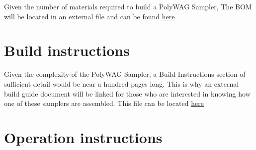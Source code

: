 \documentclass[11pt, letterpaper]{article}
\begin{document}


Given the number of materials required to build a PolyWAG Sampler, The BOM will be located in an external file and can be found \href{https://docs.google.com/spreadsheets/d/1WZbGYL1k3ne1a8Z1YOA0necr3MgxMj_BiEK7JuaGnzE/edit#gid=1118434588}{\underline{here}}


\section{Build instructions}

Given the complexity of the PolyWAG Sampler, a Build Instructions section of sufficient detail would be near a hundred pages long. This is why an external build guide document will be linked for those who are interested in knowing how one of these samplers are assembled. This file can be located \href{https://drive.google.com/file/d/1QSpYj-N6-jE-VbXLVelzRzzdIF1lMkuC/view?usp=sharing}{\underline{here}}

\section{Operation instructions}
\label{sec:OpInstr}
\end{document}
